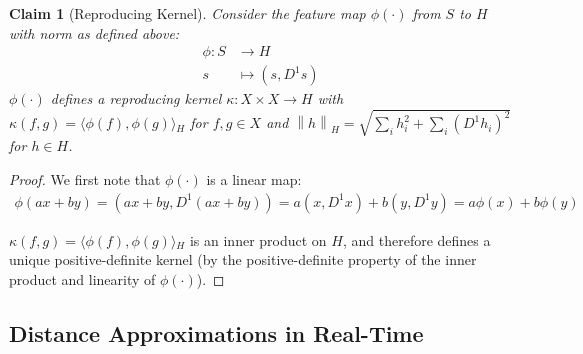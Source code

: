 \documentclass[a4paper]{article}
\newcommand{\norm}[1]{\left\lVert#1\right\rVert}
\newcommand{\innerproduct}[2]{\langle{}#1,#2\rangle{}}
\theoremstyle{def}
\theoremstyle{thm}
\newtheorem{claim}[proposition]{Claim}
\begin{document}
\begin{claim}[Reproducing Kernel]
    Consider the feature map $\phi(\cdot)$ from $S$ to $H$ with norm as defined above:
    \begin{align*}
        \phi \colon S & \rightarrow H\\
        s &\mapsto (s,D^1 s) \label{eqn:phi}
    \end{align*}
    $\phi(\cdot)$ defines a reproducing kernel $\kappa \colon X \times X \rightarrow H$ with $\kappa(f, g) = \innerproduct{\phi(f)}{\phi{(g)}}_H$ for $f,g \in X$ and $\norm{h}_H = \sqrt{\sum\limits_i{h_i^2} + \sum\limits_i{(D^1 h_i)}^2}$ for $h \in H$.
\end{claim}

\begin{proof}
    We first note that $\phi(\cdot)$ is a linear map:
    \begin{align*}
        \phi(a x + b y) = (a x + b y, D^1 (a x + b y)) = a (x, D^1 x) + b (y, D^1 y) = a \phi(x) + b \phi(y)
    \end{align*}

    $\kappa(f, g) = \innerproduct{\phi(f)}{\phi(g)}_H$ is an inner product on $H$, and therefore defines a unique positive-definite kernel (by the positive-definite property of the inner product and linearity of $\phi(\cdot)$).
\end{proof}

\subsection{Distance Approximations in Real-Time}
\label{subsec:time_series}
\end{document}
